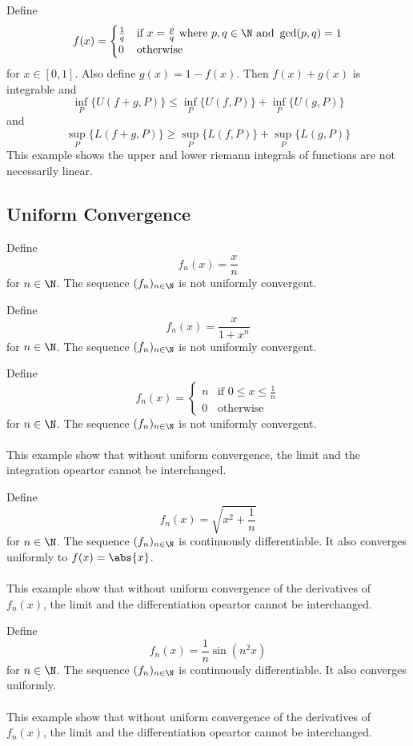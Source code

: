 \begin{eg}{}{} Define $$f(x)=\begin{cases}
\frac{1}{q} & \text{if } x=\frac{p}{q} \text{ where } p,q\in\N \text{ and } \gcd(p,q)=1\\
0 & \text{otherwise }
\end{cases}$$ for $x\in[0,1]$. Also define $g(x)=1-f(x)$.  Then $f(x)+g(x)$ is integrable and $$\inf_{P}\{U(f+g,P)\}\leq\inf_{P}\{U(f,P)\}+\inf_{P}\{U(g,P)\}$$ and $$\sup_{P}\{L(f+g,P)\}\geq\sup_{P}\{L(f,P)\}+\sup_{P}\{L(g,P)\}$$ This example shows the upper and lower riemann integrals of functions are not necessarily linear. 
\end{eg}

\subsection{Uniform Convergence}
\begin{eg}{}{} Define $$f_n(x)=\frac{x}{n}$$ for $n\in\N$. The sequence $(f_n)_{n\in\N}$ is not uniformly convergent. 
\end{eg}

\begin{eg}{}{} Define $$f_n(x)=\frac{x}{1+x^n}$$ for $n\in\N$. The sequence $(f_n)_{n\in\N}$ is not uniformly convergent. 
\end{eg}

\begin{eg}{}{} Define $$f_n(x)=\begin{cases}
n & \text{if }0\leq x\leq\frac{1}{n}\\
0 & \text{otherwise }
\end{cases}$$ for $n\in\N$. The sequence $(f_n)_{n\in\N}$ is not uniformly convergent. \\~\\
This example show that without uniform convergence, the limit and the integration opeartor cannot be interchanged. 
\end{eg}

\begin{eg}{}{} Define $$f_n(x)=\sqrt{x^2+\frac{1}{n}}$$ for $n\in\N$. The sequence $(f_n)_{n\in\N}$ is continuously differentiable. It also converges uniformly to $f(x)=\abs{x}$. \\~\\
This example show that without uniform convergence of the derivatives of $f_n(x)$, the limit and the differentiation opeartor cannot be interchanged. 
\end{eg}

\begin{eg}{}{} Define $$f_n(x)=\frac{1}{n}\sin(n^2x)$$ for $n\in\N$. The sequence $(f_n)_{n\in\N}$ is continuously differentiable. It also converges uniformly. \\~\\
This example show that without uniform convergence of the derivatives of $f_n(x)$, the limit and the differentiation opeartor cannot be interchanged. 
\end{eg}
